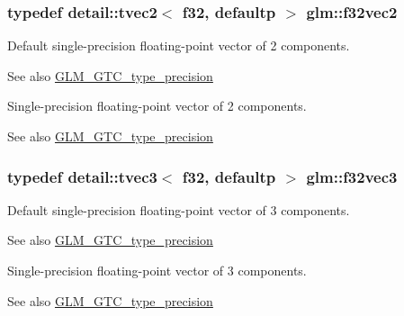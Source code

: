 \subsubsection[{\texorpdfstring{f32vec2}{f32vec2}}]{\setlength{\rightskip}{0pt plus 5cm}typedef detail\+::tvec2$<$ f32, defaultp $>$ {\bf glm\+::f32vec2}}\hypertarget{group__gtc__type__precision_ga0eba48c6b8abbee31dbf5655dd171ead}{}\label{group__gtc__type__precision_ga0eba48c6b8abbee31dbf5655dd171ead}
Default single-\/precision floating-\/point vector of 2 components. \begin{DoxySeeAlso}{See also}
\hyperlink{group__gtc__type__precision}{G\+L\+M\+\_\+\+G\+T\+C\+\_\+type\+\_\+precision}
\end{DoxySeeAlso}
Single-\/precision floating-\/point vector of 2 components. \begin{DoxySeeAlso}{See also}
\hyperlink{group__gtc__type__precision}{G\+L\+M\+\_\+\+G\+T\+C\+\_\+type\+\_\+precision} 
\end{DoxySeeAlso}
\subsubsection[{\texorpdfstring{f32vec3}{f32vec3}}]{\setlength{\rightskip}{0pt plus 5cm}typedef detail\+::tvec3$<$ f32, defaultp $>$ {\bf glm\+::f32vec3}}\hypertarget{group__gtc__type__precision_ga9b74939fb3bdd450be65f798037dd79d}{}\label{group__gtc__type__precision_ga9b74939fb3bdd450be65f798037dd79d}
Default single-\/precision floating-\/point vector of 3 components. \begin{DoxySeeAlso}{See also}
\hyperlink{group__gtc__type__precision}{G\+L\+M\+\_\+\+G\+T\+C\+\_\+type\+\_\+precision}
\end{DoxySeeAlso}
Single-\/precision floating-\/point vector of 3 components. \begin{DoxySeeAlso}{See also}
\hyperlink{group__gtc__type__precision}{G\+L\+M\+\_\+\+G\+T\+C\+\_\+type\+\_\+precision} 
\end{DoxySeeAlso}
